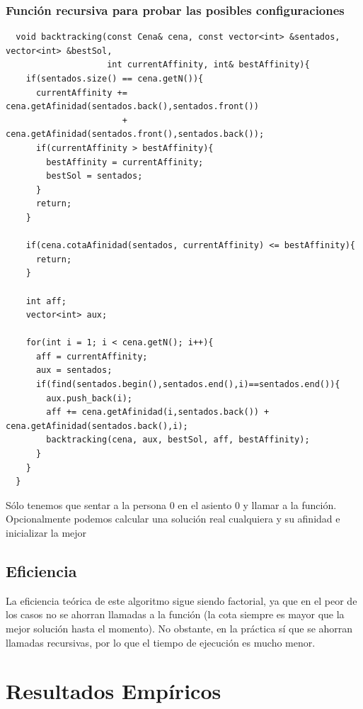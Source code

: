 \documentclass[a4]{article}
\begin{document}
\subsubsection{Función recursiva para probar las posibles configuraciones}

\begin{lstlisting}
  void backtracking(const Cena& cena, const vector<int> &sentados, vector<int> &bestSol,
                    int currentAffinity, int& bestAffinity){
    if(sentados.size() == cena.getN()){
      currentAffinity += cena.getAfinidad(sentados.back(),sentados.front())
                       + cena.getAfinidad(sentados.front(),sentados.back());
      if(currentAffinity > bestAffinity){
        bestAffinity = currentAffinity;
        bestSol = sentados;
      }
      return;
    }
    
    if(cena.cotaAfinidad(sentados, currentAffinity) <= bestAffinity){
      return;
    }
    
    int aff;
    vector<int> aux;
    
    for(int i = 1; i < cena.getN(); i++){
      aff = currentAffinity;
      aux = sentados;
      if(find(sentados.begin(),sentados.end(),i)==sentados.end()){
        aux.push_back(i);
        aff += cena.getAfinidad(i,sentados.back()) + cena.getAfinidad(sentados.back(),i);
        backtracking(cena, aux, bestSol, aff, bestAffinity);
      }
    }
  }
\end{lstlisting}

Sólo tenemos que sentar a la persona 0 en el asiento 0 y llamar a la
función. Opcionalmente podemos calcular una solución real cualquiera y
su afinidad e inicializar la mejor 

\subsection{Eficiencia}

La eficiencia teórica de este algoritmo sigue siendo factorial, ya que
en el peor de los casos no se ahorran llamadas a la función (la cota
siempre es mayor que la mejor solución hasta el momento). No obstante,
en la práctica sí que se ahorran llamadas recursivas, por lo que el
tiempo de ejecución es mucho menor.

\newpage

\section{Resultados Empíricos}
\end{document}
